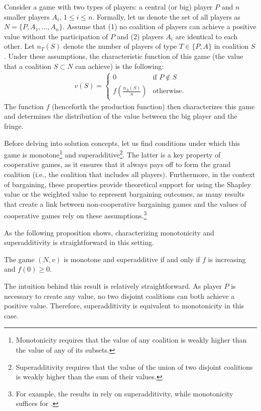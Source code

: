 Consider a game with two types of players: a central (or big) player $P$ and $n$ smaller players $A_i$, $1 \leq i \leq n$.
Formally, let us denote the set of all players as $N = \{P, A_1, \dots, A_n\}$.
Assume that (1) no coalition of players can achieve a positive value without the participation of $P$ and (2) players $A_i$ are identical to each other.
Let $n_T(S)$ denote the number of players of type $T \in \{P, A\}$ in coalition $S$.
Under these assumptions, the characteristic function of this game (the value that a coalition $S \subset N$ can achieve) is the following:
\begin{align*}
    v(S) = \begin{cases}
        0                              & \text{if } P \notin S \\
        f\left(\frac{n_A(S)}{n}\right) & \text{otherwise}.
    \end{cases}
\end{align*}
The function $f$ (henceforth the production function) then characterizes this game and determines the distribution of the value between the big player and the fringe.

Before delving into solution concepts, let us find conditions under which this game is monotone\footnote{
    Monotonicity requires that the value of any coalition is weakly higher than the value of any of its subsets.
} and superadditive\footnote{
    Superadditivity requires that the value of the union of two disjoint coalitions is weakly higher than the sum of their values.
}.
The latter is a key property of cooperative games, as it ensures that it always pays off to form the grand coalition (i.e., the coalition that includes all players).
Furthermore, in the context of bargaining, these properties provide theoretical support for using the Shapley value or the weighted value to represent bargaining outcomes, as many results that create a link between non-cooperative bargaining games and the values of cooperative games rely on these assumptions.\footnote{
    For example, the results in \textcite{gul1989bargaining} rely on superadditivity, while monotonicity suffices for \textcite[]{hart1996bargaining}.
}

As the following proposition shows, characterizing monotonicity and superadditivity is straightforward in this setting.
\begin{proposition}
    \label{prop:monotone}
    The game $(N, v)$ is monotone and superadditive if and only if $f$ is increasing and $f(0) \geq 0$.
\end{proposition}
The intuition behind this result is relatively straightforward.
As player $P$ is necessary to create any value, no two disjoint coalitions can both achieve a positive value.
Therefore, superadditivity is equivalent to monotonicity in this case.

